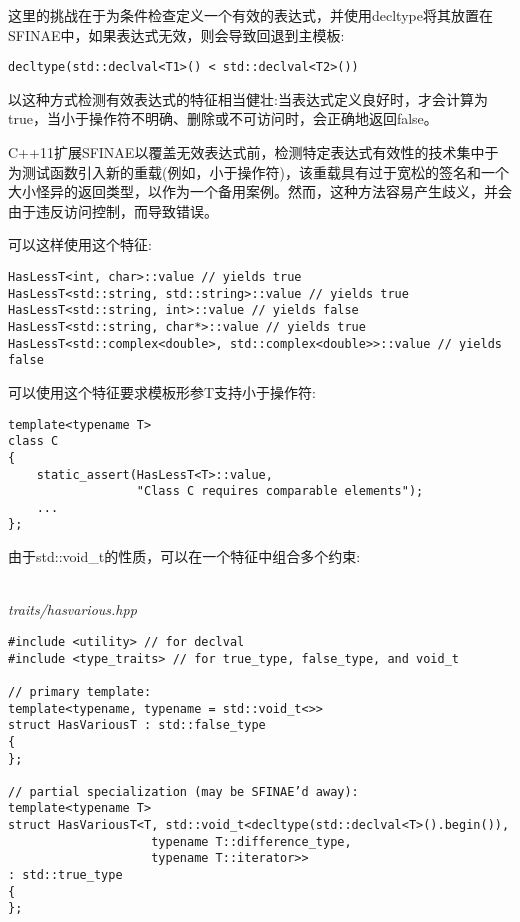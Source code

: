 这里的挑战在于为条件检查定义一个有效的表达式，并使用decltype将其放置在SFINAE中，如果表达式无效，则会导致回退到主模板:

\begin{lstlisting}[style=styleCXX]
decltype(std::declval<T1>() < std::declval<T2>())
\end{lstlisting}

以这种方式检测有效表达式的特征相当健壮:当表达式定义良好时，才会计算为true，当小于操作符不明确、删除或不可访问时，会正确地返回false。

\begin{tcolorbox}[colback=webgreen!5!white,colframe=webgreen!75!black]
\hspace*{0.75cm}C++11扩展SFINAE以覆盖无效表达式前，检测特定表达式有效性的技术集中于为测试函数引入新的重载(例如，小于操作符)，该重载具有过于宽松的签名和一个大小怪异的返回类型，以作为一个备用案例。然而，这种方法容易产生歧义，并会由于违反访问控制，而导致错误。
\end{tcolorbox}

可以这样使用这个特征:

\begin{lstlisting}[style=styleCXX]
HasLessT<int, char>::value // yields true
HasLessT<std::string, std::string>::value // yields true
HasLessT<std::string, int>::value // yields false
HasLessT<std::string, char*>::value // yields true
HasLessT<std::complex<double>, std::complex<double>>::value // yields false
\end{lstlisting}

可以使用这个特征要求模板形参T支持小于操作符:

\begin{lstlisting}[style=styleCXX]
template<typename T>
class C
{
	static_assert(HasLessT<T>::value,
				  "Class C requires comparable elements");
	...
};
\end{lstlisting}

由于std::void\_t的性质，可以在一个特征中组合多个约束:

\hspace*{\fill} \\ %
\noindent
\textit{traits/hasvarious.hpp}
\begin{lstlisting}[style=styleCXX]
#include <utility> // for declval
#include <type_traits> // for true_type, false_type, and void_t

// primary template:
template<typename, typename = std::void_t<>>
struct HasVariousT : std::false_type
{
};

// partial specialization (may be SFINAE’d away):
template<typename T>
struct HasVariousT<T, std::void_t<decltype(std::declval<T>().begin()),
					typename T::difference_type,
					typename T::iterator>>
: std::true_type
{
};
\end{lstlisting}

